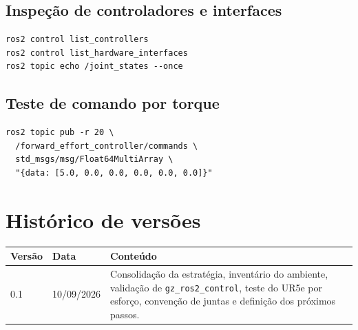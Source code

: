 \documentclass[11pt,a4paper]{article}
\begin{document}
\subsection{Inspeção de controladores e interfaces}
\begin{lstlisting}
ros2 control list_controllers
ros2 control list_hardware_interfaces
ros2 topic echo /joint_states --once
\end{lstlisting}

\subsection{Teste de comando por torque}
\begin{lstlisting}
ros2 topic pub -r 20 \
  /forward_effort_controller/commands \
  std_msgs/msg/Float64MultiArray \
  "{data: [5.0, 0.0, 0.0, 0.0, 0.0, 0.0]}"
\end{lstlisting}

\section{Histórico de versões}

\begin{tabular}{p{}p{}p{}}
\toprule
\textbf{Versão} & \textbf{Data} & \textbf{Conteúdo} \\
\midrule
0.1 & 10/09/2026 & Consolidação da estratégia, inventário do ambiente, validação de \texttt{gz\_ros2\_control}, teste do UR5e por esforço, convenção de juntas e definição dos próximos passos. \\
\bottomrule
\end{tabular}
\end{document}
